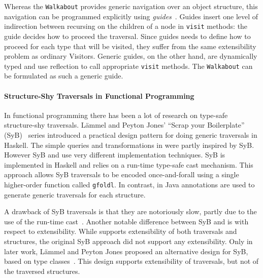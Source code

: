 Whereas the \lstinline{Walkabout} provides generic navigation over an object structure, this navigation can be programmed explicitly using \textit{guides}~\cite{bravenboer2001guiding}.
Guides insert one level of indirection between recursing on the children of a node in \lstinline{visit} methods: the guide decides how to proceed the traversal.
Since guides needs to define how to proceed for each type that will be visited, they suffer from the same extensibility problem
as ordinary Visitors.
Generic guides, on the other hand, are dynamically typed and use reflection to call appropriate \lstinline{visit} methods.
The \lstinline{Walkabout} can be formulated as such a generic guide.





\paragraph{Structure-Shy Traversals in Functional Programming}
In
functional programming there has been a lot of research on type-safe
structure-shy traversals. L\"ammel and Peyton Jones' ``Scrap your
Boilerplate'' (SyB)~\cite{ralf03syb,lammel04syb,lammel05syb} series
introduced a practical design pattern for doing generic
traversals in Haskell. The simple queries and transformations in
\name were partly inspired by SyB. However SyB and \name use very
different implementation techniques. SyB is implemented in Haskell and
relies on a run-time type-safe cast mechanism. This approach allows
SyB traversals to be encoded once-and-forall using a single
higher-order function called {\small\texttt{gfoldl}}.
In contrast, in \name
Java annotations are used to generate generic traversals for each
structure.

A drawback of SyB traversals is that they are notoriously
slow, partly due to the use of the run-time
cast~\cite{adams2012tyb}. Another notable difference between SyB and
\name is with respect to extensibility. While \name supports
extensibility of both traversals and structures, the original SyB
approach did not support any extensibility. Only in later work,
L\"ammel and Peyton Jones proposed an alternative design for SyB,
based on type classes~\cite{wadler89type-classes}.
This design supports extensibility of traversals, but not of the
traversed structures.

